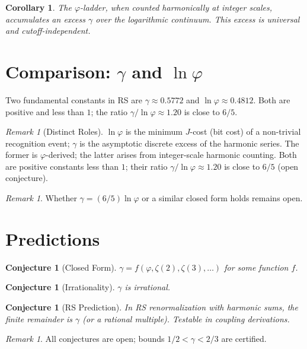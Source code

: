 \documentclass[12pt,a4paper]{article}
\newtheorem{corollary}[theorem]{Corollary}
\newtheorem{conjecture}[theorem]{Conjecture}
\theoremstyle{definition}
\theoremstyle{remark}
\newtheorem{remark}[theorem]{Remark}
\begin{document}
\begin{corollary}
The $\varphi$-ladder, when counted harmonically at integer scales,
accumulates an excess $\gamma$ over the logarithmic continuum.  This
excess is universal and cutoff-independent.
\end{corollary}

\section{Comparison: $\gamma$ and $\ln\varphi$}
\label{sec:comparison}

Two fundamental constants in RS are $\gamma \approx 0.5772$ and
$\ln\varphi \approx 0.4812$.  Both are positive and less than $1$;
the ratio $\gamma/\ln\varphi \approx 1.20$ is close to $6/5$.

\begin{remark}[Distinct Roles]
$\ln\varphi$ is the minimum $J$-cost (bit cost) of a non-trivial
recognition event; $\gamma$ is the asymptotic discrete excess of the
harmonic series.  The former is $\varphi$-derived; the latter arises
from integer-scale harmonic counting.  Both are positive constants
less than $1$; their ratio $\gamma/\ln\varphi \approx 1.20$ is close
to $6/5$ (open conjecture).
\end{remark}

\begin{remark}
Whether $\gamma = (6/5)\ln\varphi$ or a similar closed form holds
remains open.
\end{remark}

\section{Predictions}
\label{sec:predictions}

\begin{conjecture}[Closed Form]
$\gamma = f(\varphi, \zeta(2), \zeta(3), \ldots)$ for some function $f$.
\end{conjecture}

\begin{conjecture}[Irrationality]
$\gamma$ is irrational.
\end{conjecture}

\begin{conjecture}[RS Prediction]
In RS renormalization with harmonic sums, the finite remainder is
$\gamma$ (or a rational multiple).  Testable in coupling derivations.
\end{conjecture}

\begin{remark}
All conjectures are open; bounds $1/2 < \gamma < 2/3$ are certified.
\end{remark}
\end{document}
